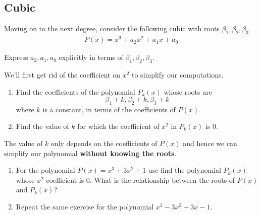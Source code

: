\newpage
\subsection{Cubic}
Moving on to the next degree, consider the following cubic with roots $ \beta_1, \beta_2, \beta_3$.
\begin{align*}
	P(x) = x^3 + a_2 x^2 + a_1 x + a_0
\end{align*}
\begin{questions}
	\item Express $ a_2, a_1, a_0$ explicitly in terms of $ \beta_1, \beta_2, \beta_3$.
\end{questions}
We'll first get rid of the coefficient on $ x^2$ to simplify our computations.
\begin{questions}[resume]
	\item \begin{enumerate}
		\item Find the coefficients of the polynomial $ P_k(x)$ whose roots are $$ \beta_1 + k, \beta_2 + k, \beta_3 + k$$ where $ k$ is a constant, in terms of the coefficients of $ P(x)$.
		\item Find the value of $ k$ for which the coefficient of $ x^2$ in $ P_k(x)$ is 0.
	\end{enumerate}
	The value of $ k$ only depends on the coefficients of $ P(x)$ and hence we can simplify our polynomial \textbf{without knowing the roots}.
	\begin{enumerate}[resume]
		\item For the polynomial $ P(x) = x^3 + 3x^2 + 1$ use find the polynomial $ P_k(x)$ whose $ x^2$ coefficient is 0. What is the relationship between the roots of $ P(x)$ and $ P_k(x)$?
		\item Repeat the same exercise for the polynomial $ x^3 - 3x^2 + 3x - 1$.
	\end{enumerate}
\end{questions}





\newpage
